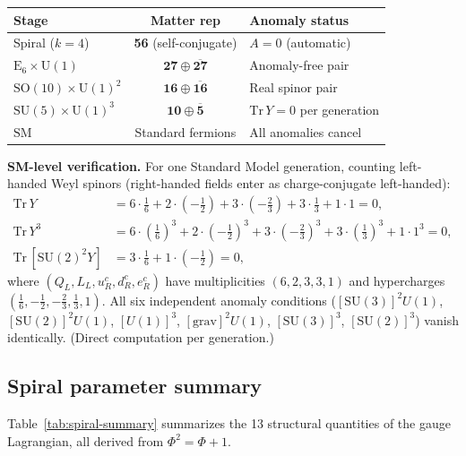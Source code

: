 \documentclass[12pt,a4paper]{article}
\begin{document}
\begin{center}
\small
\begin{tabular}{|l|c|l|}
\hline
\textbf{Stage} & \textbf{Matter rep} & \textbf{Anomaly status} \\
\hline
Spiral ($k{=}4$) & \textbf{56} (self-conjugate) & $A = 0$ (automatic) \\
$\mathrm{E}_6 \times \mathrm{U}(1)$ & $\mathbf{27} \oplus \overline{\mathbf{27}}$ & Anomaly-free pair \\
$\mathrm{SO}(10) \times \mathrm{U}(1)^2$ & $\mathbf{16} \oplus \overline{\mathbf{16}}$ & Real spinor pair \\
$\mathrm{SU}(5) \times \mathrm{U}(1)^3$ & $\mathbf{10} \oplus \overline{\mathbf{5}}$ & $\mathrm{Tr}\,Y = 0$ per generation \\
$\mathrm{SM}$ & Standard fermions & All anomalies cancel \\
\hline
\end{tabular}
\end{center}

\textbf{SM-level verification.} For one Standard Model generation, counting left-handed Weyl spinors (right-handed fields enter as charge-conjugate left-handed):
\begin{align}
\mathrm{Tr}\,Y &= 6\!\cdot\!\tfrac{1}{6} + 2\!\cdot\!(-\tfrac{1}{2}) + 3\!\cdot\!(-\tfrac{2}{3}) + 3\!\cdot\!\tfrac{1}{3} + 1\!\cdot\!1 = 0, \\
\mathrm{Tr}\,Y^3 &= 6\!\cdot\!(\tfrac{1}{6})^3 + 2\!\cdot\!(-\tfrac{1}{2})^3 + 3\!\cdot\!(-\tfrac{2}{3})^3 + 3\!\cdot\!(\tfrac{1}{3})^3 + 1\!\cdot\!1^3 = 0, \\
\mathrm{Tr}\,[\mathrm{SU}(2)^2 Y] &= 3\!\cdot\!\tfrac{1}{6} + 1\!\cdot\!(-\tfrac{1}{2}) = 0,
\end{align}
where $(Q_L, L_L, u_R^c, d_R^c, e_R^c)$ have multiplicities $(6, 2, 3, 3, 1)$ and hypercharges $(\tfrac{1}{6}, -\tfrac{1}{2}, -\tfrac{2}{3}, \tfrac{1}{3}, 1)$. All six independent anomaly conditions ($[\mathrm{SU}(3)]^2 U(1)$, $[\mathrm{SU}(2)]^2 U(1)$, $[U(1)]^3$, $[\mathrm{grav}]^2 U(1)$, $[\mathrm{SU}(3)]^3$, $[\mathrm{SU}(2)]^3$) vanish identically. (Direct computation per generation.)

\subsection{Spiral parameter summary}

Table~\ref{tab:spiral-summary} summarizes the 13 structural quantities of the gauge Lagrangian, all derived from $\Phi^2 = \Phi + 1$.
\end{document}
